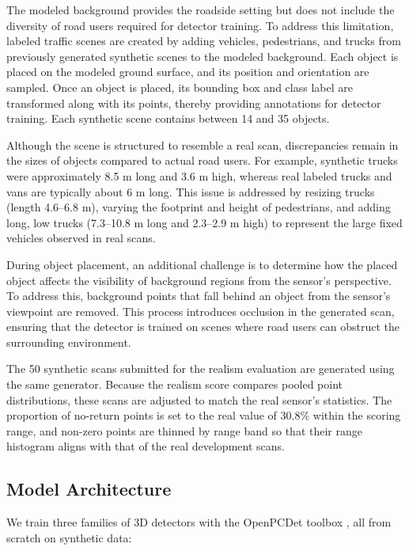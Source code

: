 \documentclass[conference]{IEEEtran}
\begin{document}
The modeled background provides the roadside setting but does not include the diversity of road users required for detector training. To address this limitation, labeled traffic scenes are created by adding vehicles, pedestrians, and trucks from previously generated synthetic scenes to the modeled background. Each object is placed on the modeled ground surface, and its position and orientation are sampled. Once an object is placed, its bounding box and class label are transformed along with its
points, thereby providing annotations for detector training. Each synthetic scene contains between 14 and 35 objects.

Although the scene is structured to resemble a real scan, discrepancies remain in the sizes of objects compared to actual road users. For example, synthetic trucks were approximately 8.5 m long and 3.6 m high, whereas real labeled trucks and vans are typically about 6 m long. This issue is addressed by resizing trucks (length 4.6–6.8 m), varying the footprint and height of pedestrians, and adding long, low trucks (7.3–10.8 m long and 2.3–2.9 m high) to represent the large fixed vehicles observed in real scans.

During object placement, an additional challenge is to determine how the placed object affects the visibility of background regions from the sensor's perspective. To address this, background points that fall behind an object from the sensor's viewpoint are removed. This process introduces occlusion in the generated scan, ensuring that the detector is trained on scenes where road users can obstruct the surrounding environment.

The 50 synthetic scans submitted for the realism evaluation are generated using the same generator. Because the realism score compares pooled point distributions, these scans are adjusted to match the real sensor's statistics. The proportion of no-return points is set to the real value of 30.8\% within the scoring range, and non-zero points are thinned by range band so that their range histogram aligns with that of the real development scans.

\subsection{Model Architecture}

We train three families of 3D detectors with the OpenPCDet toolbox \cite{openpcdet}, all from scratch on synthetic data:
\end{document}
